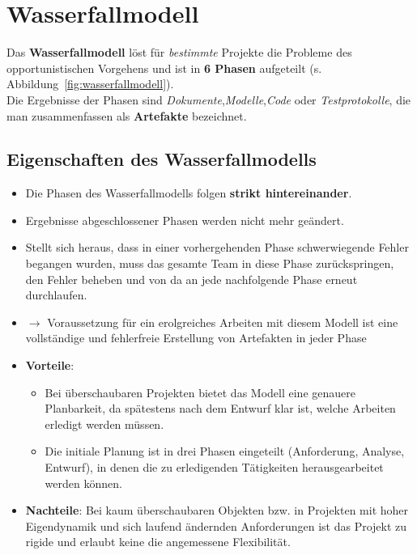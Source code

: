 \section{Wasserfallmodell}

Das \textbf{Wasserfallmodell} löst für \textit{bestimmte} Projekte die Probleme des opportunistischen Vorgehens und ist in \textbf{6 Phasen} aufgeteilt (s. Abbildung~\ref{fig:wasserfallmodell}).\\
Die Ergebnisse der Phasen sind \textit{Dokumente},\textit{Modelle},\textit{Code} oder \textit{Testprotokolle}, die man zusammenfassen als \textbf{Artefakte} bezeichnet.\\

\subsection*{Eigenschaften des Wasserfallmodells}
\begin{itemize}
    \item Die Phasen des Wasserfallmodells folgen \textbf{strikt hintereinander}.
    \item Ergebnisse abgeschlossener Phasen werden nicht mehr geändert.
    \item Stellt sich heraus, dass in einer vorhergehenden Phase schwerwiegende Fehler begangen wurden, muss das gesamte Team in diese Phase zurückspringen, den Fehler beheben und von da an jede nachfolgende Phase erneut durchlaufen.
    \item[] $\rightarrow$ Voraussetzung für ein erolgreiches Arbeiten mit diesem Modell ist eine vollständige und fehlerfreie Erstellung von Artefakten in jeder Phase
    \item \textbf{Vorteile}:
        \begin{itemize}
            \item Bei überschaubaren Projekten bietet das Modell eine genauere Planbarkeit, da spätestens nach dem Entwurf klar ist, welche Arbeiten erledigt werden müssen.
            \item Die initiale Planung ist in drei Phasen eingeteilt (Anforderung, Analyse, Entwurf), in denen die zu erledigenden Tätigkeiten herausgearbeitet werden können.
        \end{itemize}
    \item \textbf{Nachteile}: Bei kaum überschaubaren Objekten bzw. in Projekten mit hoher Eigendynamik und sich laufend ändernden Anforderungen ist das Projekt zu rigide und erlaubt keine die angemessene Flexibilität.
\end{itemize}



